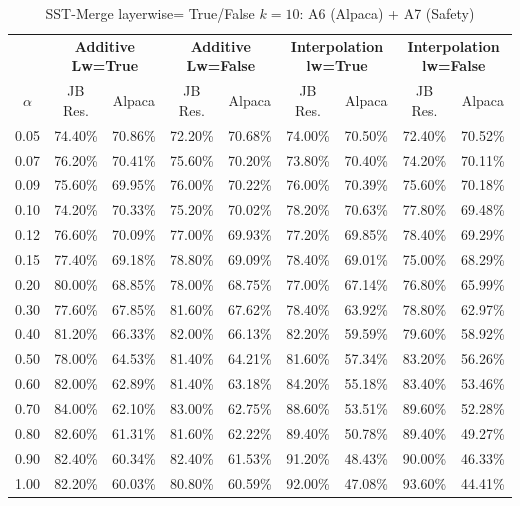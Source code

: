 \begin{table}[h]
\centering
\caption{SST-Merge layerwise= True/False $k=10$: A6 (Alpaca) + A7 (Safety)}
\label{tab:res_a6_a7_sst_10}
\begin{tabular}{c|cc|cc|cc|cc}
\hline
 & \multicolumn{2}{c|}{\textbf{Additive Lw=True}} & \multicolumn{2}{c|}{\textbf{Additive Lw=False}} & \multicolumn{2}{c|}{\textbf{Interpolation lw=True}}& \multicolumn{2}{c}{\textbf{Interpolation lw=False}} \\
$\alpha$ & JB Res. & Alpaca & JB Res. & Alpaca & JB Res. & Alpaca & JB Res. & Alpaca \\
\hline
0.05 & 74.40\% & 70.86\% & 72.20\% & 70.68\% & 74.00\% & 70.50\% & 72.40\% & 70.52\% \\
0.07 & 76.20\% & 70.41\% & 75.60\% & 70.20\% & 73.80\% & 70.40\% & 74.20\% & 70.11\% \\
0.09 & 75.60\% & 69.95\% & 76.00\% & 70.22\% & 76.00\% & 70.39\% & 75.60\% & 70.18\% \\
0.10 & 74.20\% & 70.33\% & 75.20\% & 70.02\% & 78.20\% & 70.63\% & 77.80\% & 69.48\% \\
0.12 & 76.60\% & 70.09\% & 77.00\% & 69.93\% & 77.20\% & 69.85\% & 78.40\% & 69.29\% \\
0.15 & 77.40\% & 69.18\% & 78.80\% & 69.09\% & 78.40\% & 69.01\% & 75.00\% & 68.29\% \\
0.20 & 80.00\% & 68.85\% & 78.00\% & 68.75\% & 77.00\% & 67.14\% & 76.80\% & 65.99\% \\
0.30 & 77.60\% & 67.85\% & 81.60\% & 67.62\% & 78.40\% & 63.92\% & 78.80\% & 62.97\% \\
0.40 & 81.20\% & 66.33\% & 82.00\% & 66.13\% & 82.20\% & 59.59\% & 79.60\% & 58.92\% \\
0.50 & 78.00\% & 64.53\% & 81.40\% & 64.21\% & 81.60\% & 57.34\% & 83.20\% & 56.26\% \\
0.60 & 82.00\% & 62.89\% & 81.40\% & 63.18\% & 84.20\% & 55.18\% & 83.40\% & 53.46\% \\
0.70 & 84.00\% & 62.10\% & 83.00\% & 62.75\% & 88.60\% & 53.51\% & 89.60\% & 52.28\% \\
0.80 & 82.60\% & 61.31\% & 81.60\% & 62.22\% & 89.40\% & 50.78\% & 89.40\% & 49.27\% \\
0.90 & 82.40\% & 60.34\% & 82.40\% & 61.53\% & 91.20\% & 48.43\% & 90.00\% & 46.33\% \\
1.00 & 82.20\% & 60.03\% & 80.80\% & 60.59\% & 92.00\% & 47.08\% & 93.60\% & 44.41\% \\
\hline
\end{tabular}
\end{table}
\FloatBarrier


